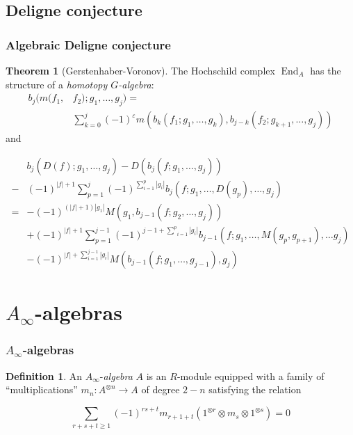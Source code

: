 \documentclass{beamer}
\theoremstyle{definition}
\newtheorem{theo}{Theorem}
\newtheorem{defi}{Definition}
\DeclareMathOperator{\End}{End}
\begin{document}
\subsection{Deligne conjecture}
\begin{frame}
\frametitle{Algebraic Deligne conjecture}
\begin{theo}[Gerstenhaber-Voronov]
 The Hochschild complex $\End_A$ has the structure of a \emph{homotopy $G$-algebra}:\pause
 \begin{align*}
 b_j(m(f_1,&f_2);g_1,\dots,g_j) = \\
 &\sum_{k=0}^j (-1)^\varepsilon m(b_k(f_1;g_1,\dots, g_k),b_{j-k}(f_2;g_{k+1},\dots, g_j))
 \end{align*}
 and
\end{theo}
\end{frame}
\begin{frame}
\begin{block}{}
 \begin{align*}
&b_j(D(f);g_1,\dots, g_j)-D(b_j(f;g_1,\dots,g_j))\\
-&(-1)^{|f|+1}\sum_{p=1}^j(-1)^{\sum_{i=1}^p|g_i|}b_j(f;g_1,\dots,D(g_p),\dots, g_j)\\
=&-(-1)^{(|f|+1)|g_1|}M(g_1,b_{j-1}(f;g_2,\dots, g_j))\\
 &+(-1)^{|f|+1}\sum_{p=1}^{j-1}(-1)^{j-1+\underset{i=1}{\overset{p}{\sum}}|g_i|}b_{j-1}(f;g_1,\dots,M(g_p,g_{p+1}),\dots g_j)\\
 &-(-1)^{|f|+\sum_{i=1}^{j-1}|g_i|}M(b_{j-1}(f;g_1,\dots, g_{j-1}),g_j)
\end{align*}
\end{block}
\end{frame}


\section{$A_\infty$-algebras}


\begin{frame}
\frametitle{$A_\infty$-algebras}
\begin{defi}
An $A_\infty$-\emph{algebra} $A$ is an $R$-module equipped with a family of ``multiplications'' $m_n:A^{\otimes n}\to A$ of degree $2-n$ satisfying the relation %

\[\sum_{r+s+t\geq 1}(-1)^{rs+t}m_{r+1+t}(1^{\otimes r}\otimes m_s\otimes 1^{\otimes s})=0\] %
\end{defi}
\end{frame}
\end{document}
